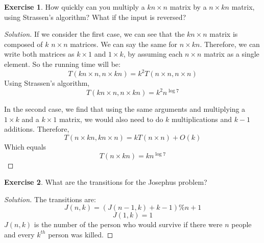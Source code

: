 \documentclass[12pt,letterpaper]{article}
\theoremstyle{definition}
\newtheorem*{exercise}{Exercise}
\newenvironment{solution}
  {\renewcommand\qedsymbol{$\blacksquare$}\begin{proof}[Solution]}
  {\end{proof}}
\begin{document}
\begin{exercise}
  How quickly can you multiply a $kn \times n$ matrix by a $n \times kn$ matrix, using Strassen's algorithm? What if the input is reversed?  
\end{exercise}
\begin{solution}
  If we consider the first case, we can see that the $kn \times n$ matrix is composed of $k$ $n \times n$ matrices. We can say the same for $n \times kn$. Therefore, we can write both matrices as $k \times 1$ and $1 \times k$, by assuming each $n \times n$ matrix as a single element. So the running time will be:
  \[T(kn \times n, n \times kn) = k^2 T(n \times n, n \times n)\]
Using Strassen's algorithm, 
\[T(kn \times n, n \times kn) = k^2 n^{\log 7}\]

In the second case, we find that using the same arguments and multiplying a $1 \times k$ and a $k \times 1$ matrix, we would also need to do $k$ multiplications and $k-1$ additions. Therefore,
\[T(n \times kn, kn \times n) = kT(n \times n) + O(k)\]
Which equals
\[T(n \times kn) = k n^{\log 7}\]
\end{solution}

\begin{exercise}
  What are the transitions for the Josephus problem? 
\end{exercise}
\begin{solution}
  The transitions are:
  \[J(n,k) = (J(n-1,k) + k - 1)\%n + 1\]
  \[J(1,k) = 1\]
  $J(n,k)$ is the number of the person who would survive if there were $n$ people and every $k^{th}$ person was killed.
\end{solution}
\end{document}
